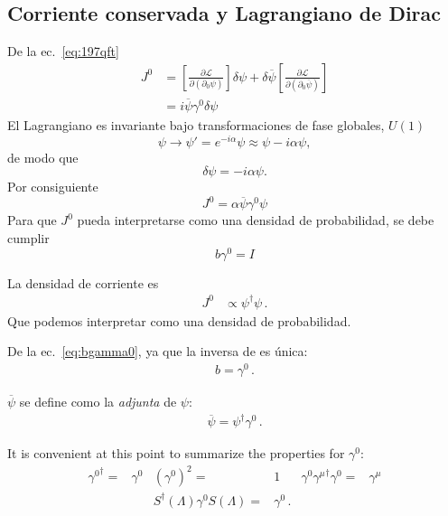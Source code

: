 \subsection{Corriente conservada y Lagrangiano de Dirac}
\label{sec:corriente-conservada}
De la ec.~\eqref{eq:197qft}
\begin{align}
  J^0&=\left[\frac{\partial\mathcal{L}}{\partial\left(\partial_0\psi\right)}\right]\delta\psi+\delta\overline{\psi}\left[\frac{\partial\mathcal{L}}{\partial\left(\partial_0\overline{\psi}\right)}\right]\nonumber\\
  &=i\overline{\psi} \gamma^0 \delta\psi
\end{align}
El Lagrangiano es invariante bajo transformaciones de fase globales, $U(1)$
\begin{equation}
  \psi\to\psi'=e^{-i\alpha}\psi\approx\psi-i\alpha\psi,
\end{equation}
de modo que
\begin{equation}
  \delta\psi=-i\alpha\psi.
\end{equation}
Por consiguiente
\begin{equation}
  J^0=\alpha\overline{\psi} \gamma^0 \psi 
\end{equation}
Para que $J^0$ pueda interpretarse como una densidad de probabilidad, se debe cumplir
\begin{equation}
  \label{eq:bgamma0}
  b \gamma^0=I
\end{equation}


La  densidad de corriente es
\begin{align}
  J^0&\propto \psi^\dagger\psi\,.
\end{align}
Que podemos interpretar como una densidad de probabilidad.

De la ec.~\eqref{eq:bgamma0}, ya que la inversa de es única:
\begin{align}
  b=\gamma^0\,.
\end{align}
 
$\overline{\psi}$ se define como la \emph{adjunta} de $\psi$:
 \begin{align}
   \overline{\psi}=\psi^\dagger\gamma^0\,.
 \end{align}

It is convenient at this point to summarize the properties for $\gamma^0$:
\begin{align}
  \label{eq:cft77}
  {\gamma^0}^\dagger=&\gamma^0 & \left(\gamma^0\right)^2=&1 & \gamma^0{\gamma^\mu}^\dagger\gamma^0=&\gamma^\mu\nonumber\\
 &&   S^\dagger(\Lambda)\gamma^0S(\Lambda)=&\gamma^0\,. &&
\end{align}



